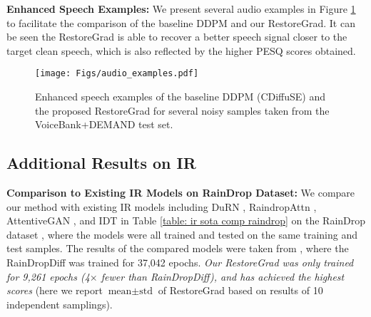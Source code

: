 \vspace{0.2cm}


\noindent\textbf{Enhanced Speech Examples:}
We present several audio examples in Figure \ref{fig: audio examples} to facilitate the comparison of the baseline DDPM and our RestoreGrad. It can be seen the RestoreGrad is able to recover a better speech signal closer to the target clean speech, which is also reflected by the higher PESQ scores obtained. 


\begin{figure}[!th]
    \centering
    \texttt{[image: Figs/audio\_examples.pdf]}
    \caption{Enhanced speech examples of the baseline DDPM (CDiffuSE) and the proposed RestoreGrad for several noisy samples taken from the VoiceBank+DEMAND test set.}
\label{fig: audio examples}
\end{figure}


\subsection{Additional Results on IR}
\label{sec: additional results on IR appendix}

\noindent\textbf{Comparison to Existing IR Models on RainDrop Dataset:}
We compare our method with existing IR models including DuRN \citep{liu2019dual}, RaindropAttn \citep{quan2019deep}, AttentiveGAN \citep{qian2018attentive}, and IDT \citep{xiao2022image} in Table \ref{table: ir sota comp raindrop} on the RainDrop dataset \citep{qian2018attentive}, where the models were all trained and tested on the same training and test samples. The results of the compared models were taken from \citet{ozdenizci2023restoring}, where the RainDropDiff was trained for 37,042 epochs. \textit{Our RestoreGrad was only trained for 9,261 epochs (4$\times$ fewer than RainDropDiff), and has achieved the highest scores} (here we report $\text{mean}\pm \text{std}$ of RestoreGrad based on results of 10 independent samplings).

